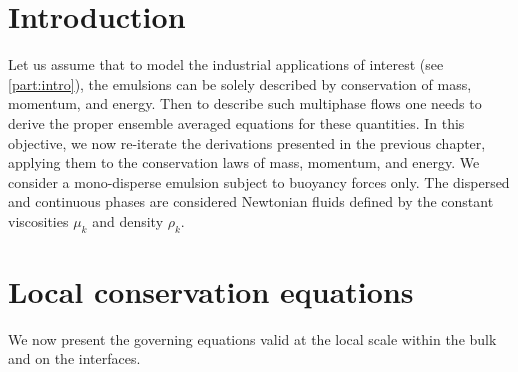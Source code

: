 \section{Introduction}
\label{ap:hypothesis}
Let us assume that to model the industrial applications of interest (see \ref{part:intro}), the emulsions can be solely described by conservation of mass, momentum, and energy. 
Then to describe such multiphase flows one needs to derive the proper ensemble averaged equations for these quantities.
In this objective, we now re-iterate the derivations presented in the previous chapter, applying them to the conservation laws of mass, momentum, and energy. 
We consider a mono-disperse emulsion subject to buoyancy forces only. 
The dispersed and continuous phases are considered Newtonian fluids defined by the constant viscosities $\mu_k$ and density $\rho_k$.

\section{Local conservation equations}

We now present the governing equations valid at the local scale within the bulk and on the interfaces. 

